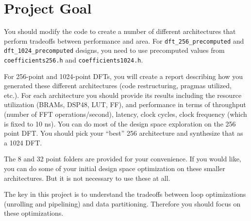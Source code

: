 \section{Project Goal}
You should modify the code to create a number of different architectures that perform tradeoffs between performance and area.  For \texttt{dft\_256\_precomputed} and \texttt{dft\_1024\_precomputed} designs, you need to use precomputed values from \texttt{coefficients256.h} and \texttt{coefficients1024.h}. 

For 256-point and 1024-point DFTs, you will create a report describing how you generated these different architectures (code restructuring, pragmas utilized, etc.). For each architecture you should provide its results including the resource utilization (BRAMs, DSP48, LUT, FF), and performance in terms of throughput (number of FFT operations/second), latency, clock cycles, clock frequency (which is fixed to 10 ns). You can do most of the design space exploration on the 256 point DFT. You should pick your ``best'' 256 architecture and synthesize that as a 1024 DFT.

The 8 and 32 point folders are provided for your convenience. If you would like, you can do some of your initial design space optimization on these smaller architectures. But it is not necessary to use these at all.

The key in this project is to understand the tradeoffs between loop optimizations (unrolling and pipelining) and data partitioning. Therefore you should focus on these optimizations.

